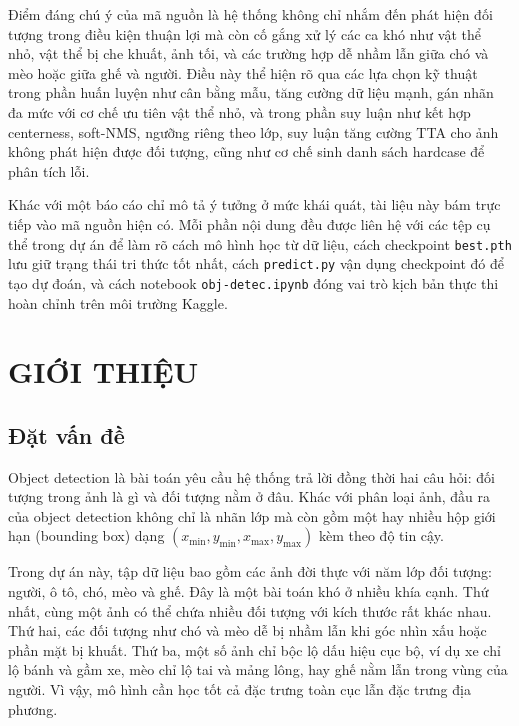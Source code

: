 \documentclass[12pt,a4paper]{article}
\begin{document}
Điểm đáng chú ý của mã nguồn là hệ thống không chỉ nhắm đến phát hiện đối tượng trong điều kiện thuận lợi mà còn cố gắng xử lý các ca khó như vật thể nhỏ, vật thể bị che khuất, ảnh tối, và các trường hợp dễ nhầm lẫn giữa chó và mèo hoặc giữa ghế và người. Điều này thể hiện rõ qua các lựa chọn kỹ thuật trong phần huấn luyện như cân bằng mẫu, tăng cường dữ liệu mạnh, gán nhãn đa mức với cơ chế ưu tiên vật thể nhỏ, và trong phần suy luận như kết hợp centerness, soft-NMS, ngưỡng riêng theo lớp, suy luận tăng cường TTA cho ảnh không phát hiện được đối tượng, cũng như cơ chế sinh danh sách hardcase để phân tích lỗi.

Khác với một báo cáo chỉ mô tả ý tưởng ở mức khái quát, tài liệu này bám trực tiếp vào mã nguồn hiện có. Mỗi phần nội dung đều được liên hệ với các tệp cụ thể trong dự án để làm rõ cách mô hình học từ dữ liệu, cách checkpoint \texttt{best.pth} lưu giữ trạng thái tri thức tốt nhất, cách \texttt{predict.py} vận dụng checkpoint đó để tạo dự đoán, và cách notebook \texttt{obj-detec.ipynb} đóng vai trò kịch bản thực thi hoàn chỉnh trên môi trường Kaggle.

\clearpage
\tableofcontents
\clearpage
\listoffigures
\clearpage
\listoftables
\clearpage

\section{GIỚI THIỆU}

\subsection{Đặt vấn đề}
Object detection là bài toán yêu cầu hệ thống trả lời đồng thời hai câu hỏi: đối tượng trong ảnh là gì và đối tượng nằm ở đâu. Khác với phân loại ảnh, đầu ra của object detection không chỉ là nhãn lớp mà còn gồm một hay nhiều hộp giới hạn (bounding box) dạng $(x_{\min}, y_{\min}, x_{\max}, y_{\max})$ kèm theo độ tin cậy.

Trong dự án này, tập dữ liệu bao gồm các ảnh đời thực với năm lớp đối tượng: người, ô tô, chó, mèo và ghế. Đây là một bài toán khó ở nhiều khía cạnh. Thứ nhất, cùng một ảnh có thể chứa nhiều đối tượng với kích thước rất khác nhau. Thứ hai, các đối tượng như chó và mèo dễ bị nhầm lẫn khi góc nhìn xấu hoặc phần mặt bị khuất. Thứ ba, một số ảnh chỉ bộc lộ dấu hiệu cục bộ, ví dụ xe chỉ lộ bánh và gầm xe, mèo chỉ lộ tai và mảng lông, hay ghế nằm lẫn trong vùng của người. Vì vậy, mô hình cần học tốt cả đặc trưng toàn cục lẫn đặc trưng địa phương.
\end{document}
